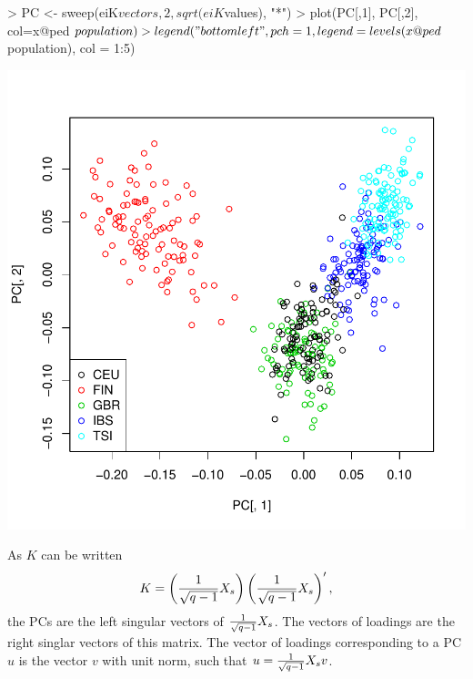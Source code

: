 \documentclass{article}
\renewenvironment{Schunk}{\vspace{\topsep}}{\vspace{\topsep}}
\begin{document}
\begin{center}
\begin{Schunk}
\begin{Sinput}
> PC <- sweep(eiK$vectors, 2, sqrt(eiK$values), "*")
> plot(PC[,1], PC[,2], col=x@ped$population)
> legend("bottomleft", pch = 1, legend = levels(x@ped$population), col = 1:5)
\end{Sinput}
\end{Schunk}
\includegraphics{gaston-032}
\end{center}

  As $K$ can be written
  \begin{equation*} 
    K = \left( {1 \over \sqrt{q-1}} X_s \right) \left( {1 \over \sqrt{q-1}} X_s \right)',
  \end{equation*}
  the PCs are the left singular vectors of ${1 \over \sqrt{q-1}} X_s$.
  The vectors of loadings are the right singlar vectors of this matrix. The vector of loadings 
  corresponding to a PC $u$ is the vector $v$ with unit norm, such that 
  $u = {1 \over \sqrt{q-1}} X_s v$.
\end{document}
